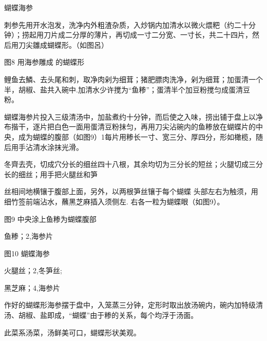 \begin{recipe}{蝴蝶海参}

\ingredients



\cooking

\step 刺参先用开水泡发，洗净内外粗渣杂质，入炒锅内加清水以微火煨粑（约二十分钟）；捞起用刀片成二分厚的薄片，再切成一寸二分宽、一寸长，共二十四片，然后用刀尖雛成蝴蝶形。（如图呂）

图8 用海参雕成 的蝴蝶形

\step 鲤鱼去鱗、去头尾和刺，取净肉剁为细茸；猪肥膘肉洗净，剁为细茸；加蛋清一个半，胡椒、盐共入碗中.加清水少许搅为“鱼糁”；蛋清半个加豆粉搅匀成蛋清豆粉。

\step 蝴蝶海参片投入三级清汤中，加盐煮约十分钟，而后使之入味，捞出铺于盘上以净布揩干，逐片把白色一面用蛋清豆粉抹匀，再用刀尖沾碗内的鱼糁放在蝴蝶片的中央，成为蝴蝶的腹部（如图9）1每片用糁长一寸、宽三分、厚四分，形如橄榄，随后用手沾清水涂抹光滑。

\step 冬齊去壳，切成穴分长的细丝四十八根，其余均切为三分长的短丝；火腿切成三分长的细丝；用手把火腿丝和笋

丝相间地横镶于腹部上面，另外，以两根笋丝镶于每个蝴蝶 头部左右为触须，用细竹签前端沾水，蘸黑芝麻插入须侧左. 右各一粒为蝴蝶眼（如图9）。

图9 中央涂上鱼糁为蝴蝶腹部

\step 鱼糁；2,海参片

图10 蝴蝶海参

\step 火腿丝；2,冬笋丝;

\step 黑芝麻；4,海参片

\step 作好的蝴蝶形海参摆于盘中，入笼蒸三分钟，定形时取出放汤碗内，碗内加特级清汤、胡椒、盐即成，“蝴蝶”由于糁的关系，每个均浮于汤面。

\notes

此菜系汤菜，汤鲜美可口，蝴蝶形状美观。

\end{recipe}


